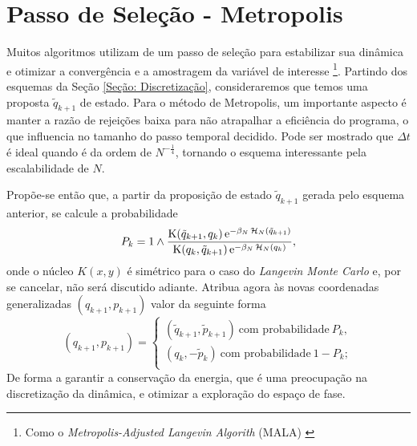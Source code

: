 \section{Passo de Seleção - Metropolis}

Muitos algoritmos utilizam de um passo de seleção para estabilizar sua dinâmica e otimizar a convergência e a amostragem da variável de interesse \footnote{Como o \textit{Metropolis-Adjusted Langevin Algorith} (MALA) \cite[Anexo~C]{leimmolecular}}. Partindo dos esquemas da Seção \ref{Seção: Discretização}, consideraremos que temos uma proposta $\tilde{q}_{k+1}$ de estado. Para o método de Metropolis, um importante aspecto é manter a razão de rejeições baixa para não atrapalhar a eficiência do programa, o que influencia no tamanho do passo temporal decidido. Pode ser mostrado que $\Delta t$ é ideal quando é da ordem de $N^{-\frac{1}{4}}$, tornando o esquema interessante pela escalabilidade de $N$.

Propõe-se então que, a partir da proposição de estado $\tilde{q}_{k+1}$ gerada pelo esquema anterior, se calcule a probabilidade
\begin{equation}
P_k = 1 \wedge \frac{\operatorname{K}(\tilde{q}_{k+1}, q_k) \operatorname{\textrm e}^{-\beta_N \operatorname{\mathcal{H}}_N(\tilde{q}_{k+1})}}{\operatorname{K}(q_k, \tilde{q}_{k+1}) \operatorname{\textrm e}^{-\beta_N \operatorname{\mathcal{H}}_N(q_{k})}},
\label{Equation: Pk}
\end{equation}
onde o núcleo $K(x, y)$ é simétrico \cite{Chafa2018} para o caso do \textit{Langevin Monte Carlo} e, por se cancelar, não será discutido adiante. Atribua agora às novas coordenadas generalizadas $(q_{k+1}, p_{k+1})$ valor da seguinte forma
\begin{equation}
	(q_{k+1}, p_{k+1}) =
\begin{cases}
	(\tilde{q}_{k+1}, \tilde{p}_{k+1}) \ \text{com probabilidade} \ P_k, \\
	(q_k, -\tilde{p}_{k}) \ \text{com probabilidade} \ 1-P_k; \\
\end{cases}
\label{Equation: Metropolis}
\end{equation}
De forma a garantir a conservação da energia, que é uma preocupação na discretização da dinâmica, e otimizar a exploração do espaço de fase.